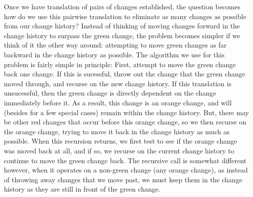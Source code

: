 \documentclass{article}
\begin{document}
Once we have translation of pairs of changes established, 
the question becomes how do we use this pairwise translation 
to eliminate as many changes 
as possible from our change history? 
Instead of thinking of moving changes 
forward in the change history 
to surpass the green change, 
the problem becomes simpler 
if we think of it the other way around: 
attempting to move green changes 
as far backward 
in the change history as possible. 
The algorithm we use for this problem 
is fairly simple in principle: 
First, attempt to move the green change back one change. 
If this is sucessful, 
throw out the change that the green change moved through, 
and recurse on the new change history. 
If this translation is unsucessful, 
then the green change is directly dependent 
on the change immediately before it. 
As a result, 
this change is an orange change, 
and will (besides for a few special cases) 
remain within the change history. 
But, there may be other 
red changes that occur before this orange change, 
so we then recurse on the orange change, 
trying to move it back in the change history 
as much as possible. 
When this recursion returns, 
we first test to see if the orange change 
was moved back at all, 
and if so, 
we recurse on the current change history 
to continue to move the green change back. 
The recursive call is somewhat different however, 
when it operates on a non-green change (any orange change), 
as instead of throwing away changes 
that we move past, 
we must keep them in the change history 
as they are still in front of the green change.
\end{document}
